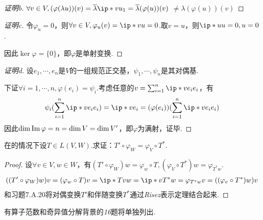 \begin{proof}[证明b]
    \(\forall v \in V,(\varphi(\lambda u))(v)=\ol{\lambda}\ip*{v}{u_1}=\ol{\lambda} (\varphi(u))(v)\)
    \(\ne \lambda (\varphi(u))(v)\)
\end{proof}

\begin{proof}[证明c]
    令\(\varphi_u=0\)，则\(\forall v \in V,\varphi_u(v)=\ip*{v}{u}=0\).取\(v=u\)，则\(\ip*{u}{u}=0,u=0\).

    因此\(\ker \varphi=\{0\}\)，即\(\varphi\)是单射变换.
\end{proof}

\begin{proof}[证明d]
    设\(e_1,\cdots,e_n\)是\(V\)的一组规范正交基，\(\psi_1,\cdots,\psi_n\)是其对偶基.

    下证\(\forall i=1,\cdots,n,\varphi(e_i)=\psi_i\).考虑任意的\(v=\sum_{i=1}^n \ip*{v}{e_i}e_i\)，有
    \begin{align*}
        \psi_i(\sum_{i=1}^n \ip*{v}{e_i}e_i)=\ip*{v}{e_i}=(\varphi(e_i))(\sum_{i=1}^n \ip*{v}{e_i}e_i)
    \end{align*}
    因此\(\dim \operatorname{Im} \varphi=n=\dim V=\dim V'\)，即\(\varphi\)为满射，证毕.
\end{proof}

\begin{problem}[7.A.20]
    在的情况下设\(T \in L(V,W)\).求证：\(T' \circ \varphi_W=\varphi_V \circ T^*\).
\end{problem}

\begin{proof}
    设\(\forall v \in V,w \in W\)，有\((T' \circ \varphi_W)w=\varphi_w \circ T,(\varphi_V \circ T^*)w=\varphi_{T^*w}\).
    \begin{align*}
        ((T' \circ \varphi_W)w)v=(\varphi_w \circ T)v=\ip*{Tv}{w}=\ip*{v}{T^*w}=\varphi_{T^*w}v=((\varphi_v \circ T^*)w)v
    \end{align*}
    {\kaishu {}和习题7.A.20将对偶变换\(T'\)和伴随变换\(T^*\)通过\textit{Risez}表示定理结合起来.}
\end{proof}

{\kaishu 有算子范数和奇异值分解背景的\textit{16}题将单独列出.}

